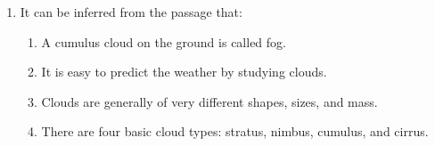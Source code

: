 \documentclass[journal,9pt,onecolumn]{IEEEtran}
\begin{document}
\begin{enumerate}
   The most accurate and the most consistent players during the tournament are respectively:
   \begin{multicols}{4}
   \begin{enumerate}
       \item P and S
       \item Q and R
       \item Q and Q
       \item R and Q
   \end{enumerate}
   \end{multicols}


\item It can be inferred from the passage that:
\begin{enumerate}
    \item A cumulus cloud on the ground is called fog.
    \item It is easy to predict the weather by studying clouds.
    \item Clouds are generally of very different shapes, sizes, and mass.
    \item There are four basic cloud types: stratus, nimbus, cumulus, and cirrus.
\end{enumerate}
\end{enumerate}
\end{document}
